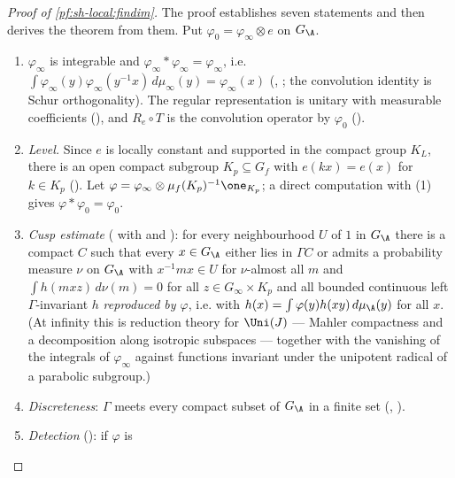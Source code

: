 \begin{proof}[Proof of \cref{pf:sh-local:findim}]
The proof establishes seven statements and then derives the theorem from them. Put
$\varphi_0=\varphi_\infty\otimes e$ on $G_\A$.
\begin{enumerate}[label=(\arabic*)]
\item $\varphi_\infty$ is integrable and $\varphi_\infty*\varphi_\infty=\varphi_\infty$, i.e.
$\int\varphi_\infty(y)\varphi_\infty(y^{-1}x)\,d\mu_\infty(y)=\varphi_\infty(x)$
(, ; the convolution identity is
Schur orthogonality). The regular representation is unitary with measurable coefficients
(), and $R_e\circ T$ is the
convolution operator by $\varphi_0$ ().
\item \emph{Level.} Since $e$ is locally constant and supported in the compact group $K_L$, there is an open compact
subgroup $K_p\subseteq G_f$ with $e(kx)=e(x)$ for $k\in K_p$ ().
Let $\varphi=\varphi_\infty\otimes\mu_f(K_p)^{-1}\one_{K_p}$; a direct computation with (1) gives
$\varphi*\varphi_0=\varphi_0$.
\item \emph{Cusp estimate} ( with
 and
): for every neighbourhood $U$ of $1$ in $G_\A$
there is a compact $C$ such that every $x\in G_\A$ either lies in $\Gamma C$ or admits a probability measure $\nu$
on $G_\A$ with $x^{-1}mx\in U$ for $\nu$-almost all $m$ and $\int h(mxz)\,d\nu(m)=0$ for all $z\in G_\infty\times
K_p$ and all bounded continuous left $\Gamma$-invariant $h$ \emph{reproduced by $\varphi$}, i.e. with
$h(x)=\int\varphi(y)h(xy)\,d\mu_\A(y)$ for all $x$. (At infinity this is reduction theory for $\Uni(J)$ --- Mahler compactness and
a decomposition along isotropic subspaces --- together with the vanishing of the integrals of $\varphi_\infty$ against
functions invariant under the unipotent radical of a parabolic subgroup.)
\item \emph{Discreteness}: $\Gamma$ meets every compact subset of $G_\A$ in a finite set
(, ).
\item \emph{Detection} (): if $\varphi$ is

\end{enumerate}
\end{proof}
